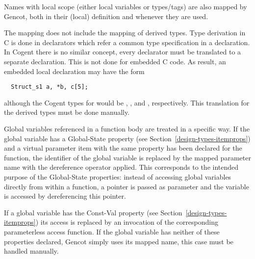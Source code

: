 Names with local scope (either local variables or types/tags) are also mapped by Gencot, both in their (local)
definition and whenever they are used. 

The mapping does not include the mapping of derived types. Type derivation in C is done in declarators which refer
a common type specification in a declaration. In Cogent there is no similar concept, every declarator must be 
translated to a separate declaration. This is not done for embedded C code. As result, an embedded
local declaration may have the form
\begin{verbatim}
  Struct_s1 a, *b, c[5];
\end{verbatim}
although the Cogent types for  would be , , and 
, respectively. This translation for the derived types must be done manually.

Global variables referenced in a function body are treated in a specific way. If the global variable has a 
Global-State property (see Section~\ref{design-types-itemprops}) and a virtual parameter item with the same
property has been declared for the function, the identifier of the global variable is replaced by the 
mapped parameter name with the dereference operator applied. This corresponds to the intended purpose of the 
Global-State properties: instead of accessing global variables directly from within a function, a pointer is 
passed as parameter and the variable is accessed by dereferencing this pointer.

If a global variable has the Const-Val property (see Section~\ref{design-types-itemprops}) its access is
replaced by an invocation of the corresponding parameterless access function. If the global variable has 
neither of these properties declared, Gencot simply uses its mapped name, this case must be handled manually.

